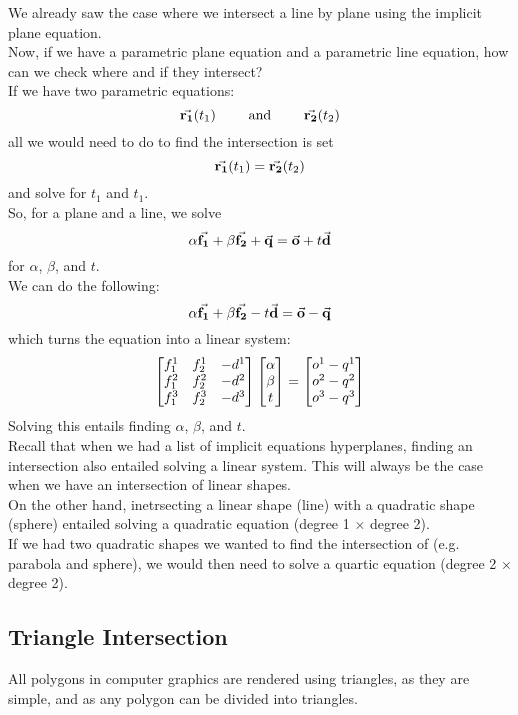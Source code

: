 \documentclass[12pt]{article}
\begin{document}
We already saw the case where we intersect
a line by plane using the implicit plane
equation. \\
Now, if we have a parametric plane equation
and a parametric line equation,
how can we check where and if they intersect? \\
If we have two parametric equations:
\[ \vec{\mathbf{r_1}}(t_1) \qquad \text{ and }
\qquad \vec{\mathbf{r_2}}(t_2) \]
all we would need to do to find the intersection
is set
\[ \vec{\mathbf{r_1}}(t_1) = \vec{\mathbf{r_2}}(t_2) \]
and solve for $t_1$ and $t_1$. \\
So, for a plane and a line, we solve
\[ \alpha \vec{\mathbf{f_1}} + \beta \vec{\mathbf{f_2}} + \vec{\mathbf{q}}
= \vec{\mathbf{o}} + t\vec{\mathbf{d}} \]
for $\alpha$, $\beta$, and $t$. \\
We can do the following:
\[ \alpha \vec{\mathbf{f_1}} + \beta \vec{\mathbf{f_2}} - t\vec{\mathbf{d}}
= \vec{\mathbf{o}} - \vec{\mathbf{q}} \]
which turns the equation into a linear system:
\[ 
    \begin{bmatrix} {f_1^1}&{f_2^1}&{-d^1}\\
    {f_1^2 }&{f_2^2}&{-d^2}\\
    {f_1^3}&{f_2^3}&{-d^3} \end{bmatrix}
    \begin{bmatrix} {\alpha}\\{\beta}\\{t} \end{bmatrix}
    = \begin{bmatrix} {o^1 - q^1}\\{o^2 - q^2}\\{o^3 - q^3} \end{bmatrix} 
\]
Solving this entails finding
$\alpha$, $\beta$, and $t$. \\

Recall that when we had a list of implicit equations
hyperplanes,
finding an intersection also entailed
solving a linear system.
This will always be the case when we have
an intersection of linear shapes. \\
On the other hand, inetrsecting a linear shape
(line) with a quadratic shape (sphere)
entailed solving a quadratic equation
(degree 1 $\times$ degree 2). \\
If we had two quadratic shapes we wanted to 
find the intersection of (e.g. parabola and sphere),
we would then need to solve a quartic equation
(degree 2 $\times$ degree 2). \\

\newpage

\subsection*{Triangle Intersection}

All polygons in computer graphics are
rendered using triangles,
as they are simple,
and as any polygon can be divided into triangles. \\
\end{document}
